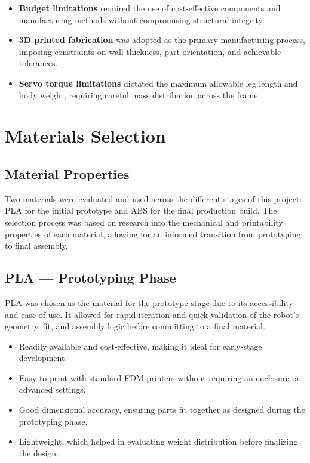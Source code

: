 \documentclass{article}
\begin{document}
\begin{itemize}
    \item \textbf{Budget limitations} required the use of cost-effective components and manufacturing methods without compromising structural integrity.
    \item \textbf{3D printed fabrication} was adopted as the primary manufacturing process, imposing constraints on wall thickness, part orientation, and achievable tolerances.
    \item \textbf{Servo torque limitations} dictated the maximum allowable leg length and body weight, requiring careful mass distribution across the frame.
\end{itemize}
\section{Materials Selection}

\subsection*{Material Properties}

Two materials were evaluated and used across the different stages of this project: PLA for the initial prototype and ABS for the final production build. The selection process was based on research into the mechanical and printability properties of each material, allowing for an informed transition from prototyping to final assembly.

\subsection*{PLA --- Prototyping Phase}

PLA was chosen as the material for the prototype stage due to its accessibility and ease of use. It allowed for rapid iteration and quick validation of the robot's geometry, fit, and assembly logic before committing to a final material.

\begin{itemize}
    \item Readily available and cost-effective, making it ideal for early-stage development.
    \item Easy to print with standard FDM printers without requiring an enclosure or advanced settings.
    \item Good dimensional accuracy, ensuring parts fit together as designed during the prototyping phase.
    \item Lightweight, which helped in evaluating weight distribution before finalizing the design.
\end{itemize}
\end{document}
